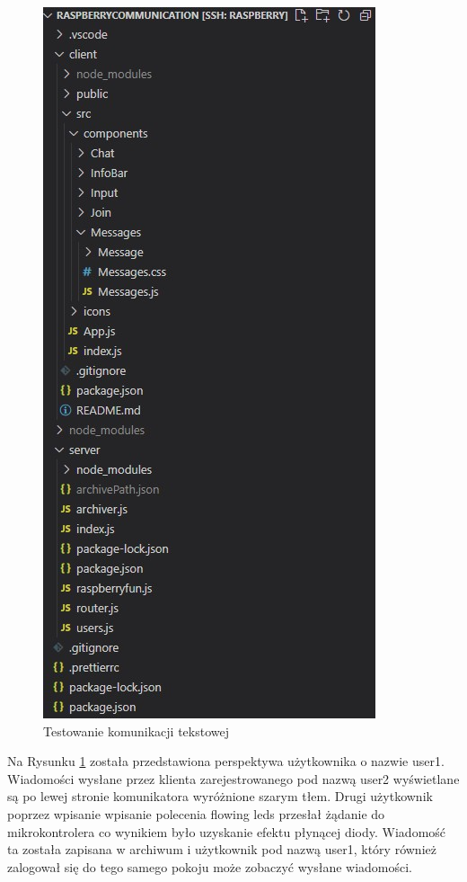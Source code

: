 \begin{figure}
	\centering
	\includegraphics[width=0.5\linewidth]{"obrazy/model"}
	\caption{Testowanie komunikacji tekstowej}
	\label{fig:44}
\end{figure}
Na Rysunku \ref{fig:44} została przedstawiona perspektywa użytkownika o nazwie user1. Wiadomości wysłane przez klienta zarejestrowanego pod nazwą user2 wyświetlane są po lewej stronie komunikatora wyróżnione szarym tłem. Drugi użytkownik poprzez wpisanie wpisanie polecenia flowing leds przesłał żądanie do mikrokontrolera co wynikiem było uzyskanie efektu płynącej diody. Wiadomość ta została zapisana w archiwum i użytkownik pod nazwą user1, który również zalogował się do tego samego pokoju może zobaczyć wysłane wiadomości. 
